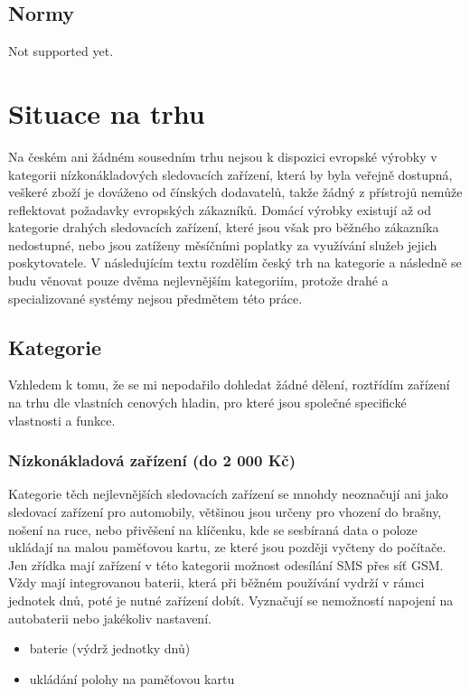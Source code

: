 \documentclass[FM,BP]{tulthesis}  %
\begin{document}
\section{Normy}
Not supported yet.


\chapter{Situace na trhu}
Na českém ani žádném sousedním trhu nejsou k dispozici evropské výrobky v kategorii nízkonákladových sledovacích zařízení, která by byla veřejně dostupná, veškeré zboží je dováženo od čínských dodavatelů, takže žádný z přístrojů nemůže reflektovat požadavky evropských zákazníků. Domácí výrobky existují až od kategorie drahých sledovacích zařízení, které jsou však pro běžného zákazníka nedostupné, nebo jsou zatíženy měsíčními poplatky za využívání služeb jejich poskytovatele. V následujícím textu rozdělím český trh na kategorie a následně se budu věnovat pouze dvěma nejlevnějším kategoriím, protože drahé a specializované systémy nejsou předmětem této práce.

\section{Kategorie}
Vzhledem k tomu, že se mi nepodařilo dohledat žádné dělení, roztřídím zařízení na trhu dle vlastních cenových hladin, pro které jsou společné specifické vlastnosti a funkce.

\subsection{Nízkonákladová zařízení (do 2 000 Kč)}
Kategorie těch nejlevnějších sledovacích zařízení se mnohdy neoznačují ani jako sledovací zařízení pro automobily, většinou jsou určeny pro vhození do brašny, nošení na ruce, nebo přivěšení na klíčenku, kde se sesbíraná data o poloze ukládají na malou paměťovou kartu, ze které jsou později vyčteny do počítače. Jen zřídka mají zařízení v této kategorii možnost odesílání SMS přes síť GSM. Vždy mají integrovanou baterii, která při běžném používání vydrží v rámci jednotek dnů, poté je nutné zařízení dobít. Vyznačují se nemožností napojení na autobaterii nebo jakékoliv nastavení.

\begin{itemize}
\item baterie (výdrž jednotky dnů)
\item ukládání polohy na paměťovou kartu
\end{itemize}
\end{document}
